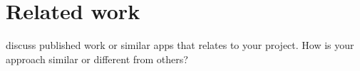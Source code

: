 \section{Related work}
discuss published work or similar apps that relates to your project. How is your approach similar or different from others? 